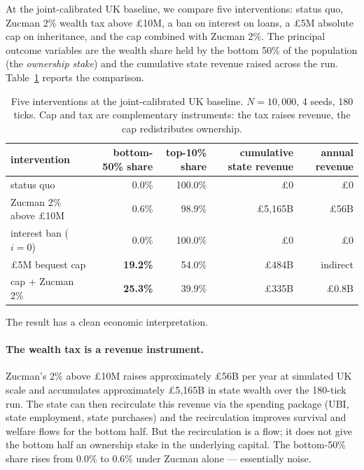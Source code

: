 \documentclass[11pt]{article}
\begin{document}
At the joint-calibrated UK baseline, we compare five interventions:
status quo, Zucman 2\% wealth tax above \pounds 10M, a ban on
interest on loans, a \pounds 5M absolute cap on inheritance, and
the cap combined with Zucman 2\%.  The principal outcome variables
are the wealth share held by the bottom 50\% of the population
(the \emph{ownership stake}) and the cumulative state revenue
raised across the run.  Table~\ref{tab:cap-tax-complementary}
reports the comparison.

\begin{table}[t]
\centering
\small
\caption{Five interventions at the joint-calibrated UK baseline.
$N = 10{,}000$, 4 seeds, 180 ticks.  Cap and tax are
complementary instruments: the tax raises revenue, the cap
redistributes ownership.}
\label{tab:cap-tax-complementary}
\begin{tabular}{lrrrr}
\toprule
intervention & bottom-50\% share & top-10\% share
& cumulative state revenue & annual revenue \\
\midrule
status quo                & 0.0\%  & 100.0\% & \pounds 0      & \pounds 0     \\
Zucman 2\% above \pounds 10M & 0.6\%  &  98.9\% & \pounds 5{,}165B & \pounds 56B    \\
interest ban ($i = 0$)    & 0.0\%  & 100.0\% & \pounds 0      & \pounds 0     \\
\pounds 5M bequest cap     & \textbf{19.2\%} &  54.0\% & \pounds 484B  & indirect    \\
cap + Zucman 2\%           & \textbf{25.3\%} &  39.9\% & \pounds 335B  & \pounds 0.8B  \\
\bottomrule
\end{tabular}
\end{table}

The result has a clean economic interpretation.

\paragraph{The wealth tax is a revenue instrument.}  Zucman's 2\%
above \pounds 10M raises approximately \pounds 56B per year at
simulated UK scale and accumulates approximately \pounds 5{,}165B
in state wealth over the 180-tick run.  The state can then
recirculate this revenue via the spending package
(UBI, state employment, state purchases) and the recirculation
improves survival and welfare flows for the bottom half.  But the
recirculation is a flow; it does not give the bottom half an
ownership stake in the underlying capital.  The bottom-50\% share
rises from 0.0\% to 0.6\% under Zucman alone --- essentially noise.
\end{document}
